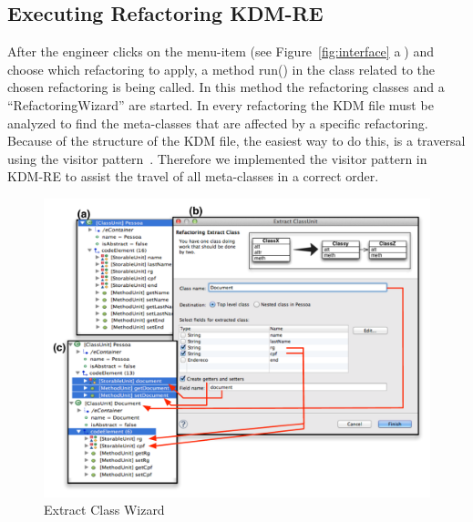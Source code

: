 \subsection{Executing Refactoring KDM-RE}

After the engineer clicks on the menu-item (see Figure~\ref{fig:interface} \textcircled{a}) and choose which refactoring to apply, a method run() in the class related to the chosen refactoring is being called. In this method the refactoring classes and a ``RefactoringWizard'' are started. In every refactoring the KDM file must be analyzed to find the meta-classes that are affected by a specific refactoring. Because of the structure of the KDM file, the easiest way to do this, is a traversal using the visitor pattern~\cite{Gamma1994}. Therefore we implemented the visitor pattern in KDM-RE to assist the travel of all meta-classes in a correct order.

\begin{figure}[!ht]
\centering
  \includegraphics[scale=0.6]{figure/Wizard2}
\caption{Extract Class Wizard}
\label{fig:wizard}
\end{figure}

